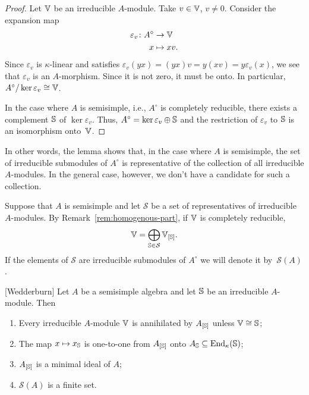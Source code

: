 \begin{proof}
    Let $\mathbb V$ be an irreducible $A$-module. Take $v\in\mathbb V$, $v\ne0$. Consider the expansion map
    \begin{align*}
        \varepsilon_v\colon A^\circ&\to\mathbb V\\
        x&\mapsto xv.
    \end{align*}
    Since $\varepsilon_v$ is $\kappa$-linear and satisfies $\varepsilon_v(yx)=(yx)v=y(xv)=y\varepsilon_v(x)$, we see that $\varepsilon_v$ is an $A$-morphism. Since it is not zero, it must be onto. In particular, $A^\circ/\ker\varepsilon_v\cong\mathbb V$.

    In the case where $A$ is semisimple, i.e., $A^\circ$ is completely reducible, there exists a complement $\mathbb S$ of $\ker\varepsilon_v$. Thus, $A^\circ=\ker\varepsilon_v\oplus\mathbb S$ and the restriction of $\varepsilon_v$ to $\mathbb S$ is an isomorphism onto~$\mathbb V$.
\end{proof}

\begin{rem}
    In other words, the lemma shows that, in the case where $A$ is semisimple, the set of irreducible submodules of $A^\circ$ is representative of the collection of all irreducible $A$-modules. In the general case, however, we don't have a candidate for such a collection.

    Suppose that $A$ is semisimple and let $\mathcal S$ be a set of representatives of irreducible $A$-modules. By Remark~\ref{rem:homogenous-part}, if $\mathbb V$ is completely reducible, 
    $$
        \mathbb V=\bigoplus_{\mathbb S\in\mathcal S}\mathbb V_{[\mathbb S]}.
    $$
    If the elements of $\mathcal S$ are irreducible submodules of $A^\circ$ we will denote it by~$\mathcal S(A)$.
\end{rem}


\begin{thm}\label{thm:Wedderburn} {\rm[Wedderburn]}
    Let\/ $A$ be a semisimple algebra and let\/ $\mathbb S$ be an irreducible\/ $A$-module. Then
    \begin{enumerate}[\rm a)]
        \item Every irreducible\/ $A$-module\/ $\mathbb V$ is annihilated by\/ $A_{[\mathbb S]}$ unless\/ $\mathbb V \cong \mathbb S$;
        
        \item The map\/ $x \mapsto x_\mathbb S$ is one-to-one from\/ $A_{[\mathbb S]}$ onto\/ $A_\mathbb S \subseteq{\operatorname{End}}_\kappa(\mathbb S)$;
        
        \item $A_{[\mathbb S]}$ is a minimal ideal of\/ $A$;
        
        \item $\mathcal S(A)$ is a finite set.
    \end{enumerate}
\end{thm}

